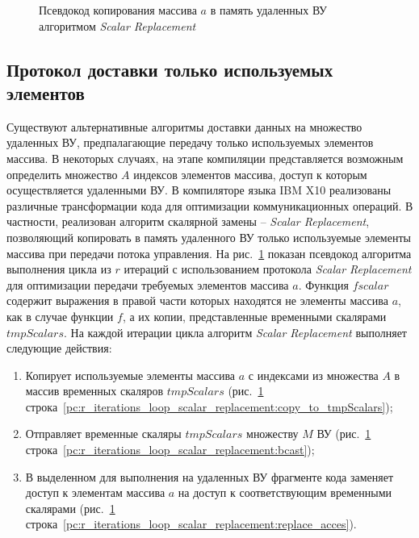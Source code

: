 \begin{figure}[!h]
	
    \caption{Псевдокод копирования массива $a$ в память удаленных ВУ алгоритмом
\textit{Scalar Replacement}}
    \label{list:r_iterations_loop_scalar_replacement}
\end{figure}

\subsection{Протокол доставки только используемых элементов}
Существуют альтернативные алгоритмы доставки данных на множество удаленных ВУ,
предпалагающие передачу только используемых элементов массива. В некоторых
случаях, на этапе компиляции представляется возможным определить множество $A$
индексов элементов массива, доступ к которым осуществляется удаленными ВУ.
В компиляторе языка IBM X10 реализованы различные трансформации кода для
оптимизации коммуникационных операций. В частности, реализован алгоритм
скалярной замены -- \textit{Scalar Replacement}, позволяющий копировать в память
удаленного ВУ только используемые элементы массива при передачи потока
управления. На рис.~\ref{list:r_iterations_loop_scalar_replacement} показан
псевдокод алгоритма выполнения цикла из $r$ итераций с использованием протокола
\textit{Scalar Replacement} для оптимизации передачи требуемых элементов массива
$a$. Функция $fscalar$ содержит выражения в правой части которых находятся
не элементы массива $a$, как в случае функции $f$, а их копии, представленные
временными скалярами $tmpScalars$. На каждой итерации цикла алгоритм
\textit{Scalar Replacement} выполняет следующие действия:
\begin{enumerate}
\item Копирует используемые элементы массива $a$ с индексами из множества $A$ в
массив временных скаляров $tmpScalars$
(рис.~\ref{list:r_iterations_loop_scalar_replacement}
строка~\ref{pc:r_iterations_loop_scalar_replacement:copy_to_tmpScalars});
\item Отправляет временные скаляры $tmpScalars$ множеству $M$ ВУ
(рис.~\ref{list:r_iterations_loop_scalar_replacement}
строка~\ref{pc:r_iterations_loop_scalar_replacement:bcast});
\item В выделенном для выполнения на удаленных ВУ фрагменте кода заменяет доступ
к элементам массива $a$ на доступ к соответствующим временными скалярами
(рис.~\ref{list:r_iterations_loop_scalar_replacement}
строка~\ref{pc:r_iterations_loop_scalar_replacement:replace_acces}).
\end{enumerate}

